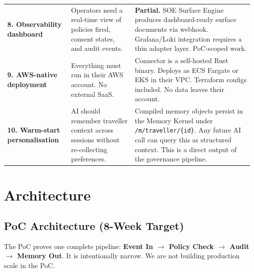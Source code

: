 \documentclass[11pt, a4paper]{article}
\begin{document}
\begin{longtable}{>{\bfseries}p{3.8cm} p{5cm} p{5cm}}
8. Observability dashboard &
Operators need a real-time view of policies fired, consent states, and audit events. &
\textbf{Partial.} SOE Surface Engine produces dashboard-ready surface documents via webhook. Grafana/Loki integration requires a thin adapter layer. PoC-scoped work. \\[6pt]

9. AWS-native deployment &
Everything must run in their AWS account. No external SaaS. &
Connector is a self-hosted Rust binary. Deploys as ECS Fargate or EKS in their VPC. Terraform configs included. No data leaves their account. \\[6pt]

10. Warm-start personalisation &
AI should remember traveller context across sessions without re-collecting preferences. &
Compiled memory objects persist in the Memory Kernel under \texttt{/m/traveller/\{id\}}. Any future AI call can query this as structured context. This is a direct output of the governance pipeline. \\

\end{longtable}

\newpage
\section{Architecture}

\subsection{PoC Architecture (8-Week Target)}

The PoC proves one complete pipeline: \textbf{Event In $\to$ Policy Check $\to$ Audit $\to$ Memory Out}.
It is intentionally narrow. We are not building production scale in the PoC.

\vspace{0.5em}
\end{document}
